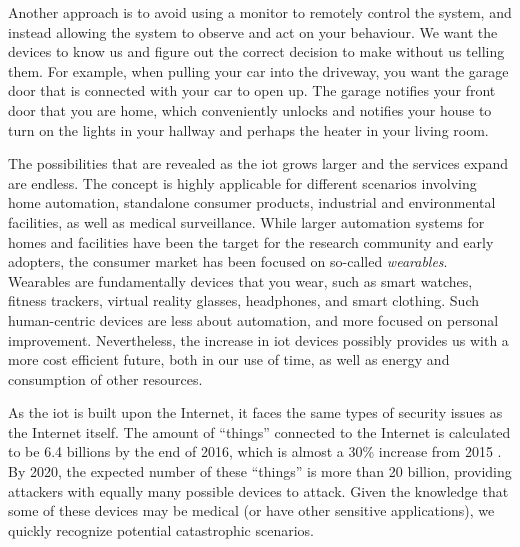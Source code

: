 Another approach is to avoid using a monitor to remotely control the system, and instead allowing the system to observe and act on your behaviour. We want the devices to know us and figure out the correct decision to make without us telling them. For example, when pulling your car into the driveway, you want the garage door that is connected with your car to open up. The garage notifies your front door that you are home, which conveniently unlocks and notifies your house to turn on the lights in your hallway and perhaps the heater in your living room.



The possibilities that are revealed as the \gls{iot} grows larger and the services expand are endless. The concept is highly applicable for different scenarios involving home automation, standalone consumer products, industrial and environmental facilities, as well as medical surveillance. While larger automation systems for homes and facilities have been the target for the research community and early adopters, the consumer market has been focused on so-called \emph{wearables}. Wearables are fundamentally devices that you wear, such as smart watches, fitness trackers, virtual reality glasses, headphones, and smart clothing. Such human-centric devices are less about automation, and more focused on personal improvement. Nevertheless, the increase in \gls{iot} devices possibly provides us with a more cost efficient future, both in our use of time, as well as energy and consumption of other resources.


As the \gls{iot} is built upon the Internet, it faces the same types of security issues as the Internet itself. The amount of ``things'' connected to the Internet is calculated to be 6.4 billions by the end of 2016, which is almost a 30\% increase from 2015 \cite{iot-gartner}. By 2020, the expected number of these ``things'' is more than 20 billion, providing attackers with equally many possible devices to attack. Given the knowledge that some of these devices may be medical (or have other sensitive applications), we quickly recognize potential catastrophic scenarios.


